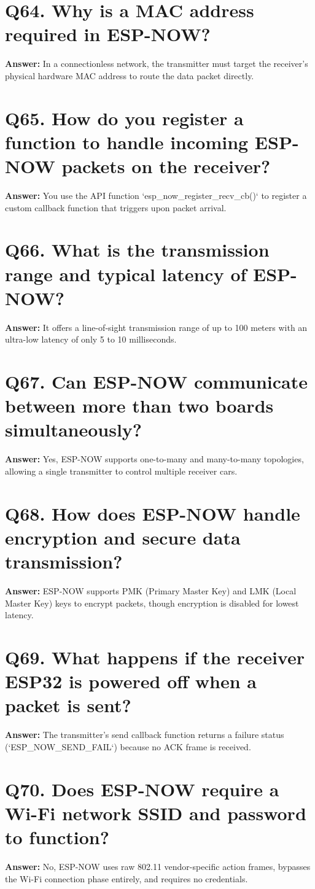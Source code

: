 \documentclass[12pt,a4paper,oneside]{report}
\begin{document}
\section{Q64. Why is a MAC address required in ESP-NOW?}
\textbf{Answer:} In a connectionless network, the transmitter must target the receiver's physical hardware MAC address to route the data packet directly.

\section{Q65. How do you register a function to handle incoming ESP-NOW packets on the receiver?}
\textbf{Answer:} You use the API function `esp\_now\_register\_recv\_cb()` to register a custom callback function that triggers upon packet arrival.

\section{Q66. What is the transmission range and typical latency of ESP-NOW?}
\textbf{Answer:} It offers a line-of-sight transmission range of up to 100 meters with an ultra-low latency of only 5 to 10 milliseconds.

\section{Q67. Can ESP-NOW communicate between more than two boards simultaneously?}
\textbf{Answer:} Yes, ESP-NOW supports one-to-many and many-to-many topologies, allowing a single transmitter to control multiple receiver cars.

\section{Q68. How does ESP-NOW handle encryption and secure data transmission?}
\textbf{Answer:} ESP-NOW supports PMK (Primary Master Key) and LMK (Local Master Key) keys to encrypt packets, though encryption is disabled for lowest latency.

\section{Q69. What happens if the receiver ESP32 is powered off when a packet is sent?}
\textbf{Answer:} The transmitter's send callback function returns a failure status (`ESP\_NOW\_SEND\_FAIL`) because no ACK frame is received.

\section{Q70. Does ESP-NOW require a Wi-Fi network SSID and password to function?}
\textbf{Answer:} No, ESP-NOW uses raw 802.11 vendor-specific action frames, bypasses the Wi-Fi connection phase entirely, and requires no credentials.
\end{document}
